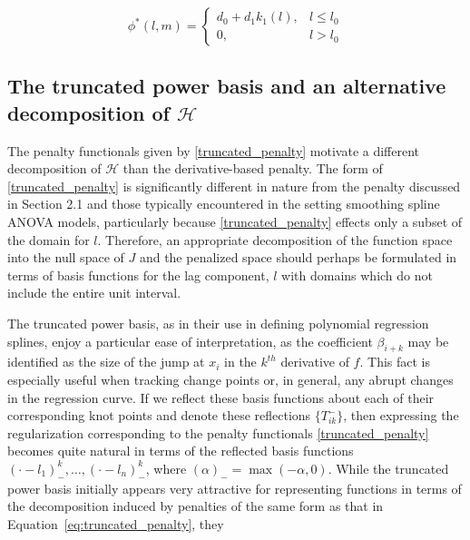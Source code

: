 \documentclass[12pt]{article}
\theoremstyle{definition}
\begin{document}
\[
\phi^*\left(l,m\right) = \left\{ \begin{array}{lr} d_0 + d_1 k_1\left(l\right), & l \le l_0 \\ 0, & l > l_0 \end{array} \right.
\]


\subsection{The truncated power basis and an alternative decomposition of $\mathcal{H}$}


The penalty functionals given by \eqref{truncated_penalty} motivate a different decomposition of $\mathcal{H}$ than the derivative-based penalty. The form of \eqref{truncated_penalty} is significantly different in nature from the penalty discussed in Section 2.1 and those typically encountered in the setting smoothing spline ANOVA models, particularly because \eqref{truncated_penalty} effects only a subset of the domain for $l$. Therefore, an appropriate decomposition of the function space into the null space of $J$ and the penalized space should perhaps be formulated in terms of basis functions for the lag component, $l$ with domains which do not include the entire unit interval. 

The truncated power basis, as in their use in defining polynomial regression splines, enjoy a particular ease of interpretation, as the coefficient $\beta_{i+k}$ may be identified as the size of the jump at $x_i$ in the $k^{th}$ derivative of $f$. This fact is especially useful when tracking change points or, in general, any abrupt changes in the regression curve. If we reflect these basis functions about each of their corresponding knot points and denote these reflections $\lbrace T^-_{ik}\rbrace$, then expressing the regularization corresponding to the penalty functionals \eqref{truncated_penalty} becomes quite natural in terms of the reflected basis functions $\left(\cdot - l_1 \right)^k_-,\dots, \left(\cdot - l_n \right)^k_-$, where $\left( \alpha \right)_- = \max\left(-\alpha,0\right)$.  While the truncated power basis initially appears very attractive for representing functions in terms of the decomposition induced by penalties of the same form as that in Equation~\ref{eq:truncated_penalty}, they 
\end{document}
